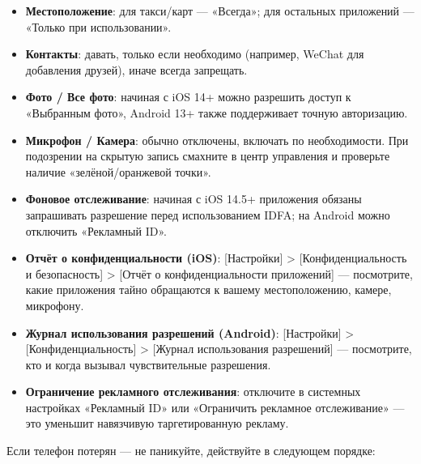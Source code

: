 
\begin{itemize}
  \item \textbf{Местоположение}: для такси/карт — «Всегда»; для остальных приложений — «Только при использовании».
  \item \textbf{Контакты}: давать, только если необходимо (например, WeChat для добавления друзей), иначе всегда запрещать.
  \item \textbf{Фото / Все фото}: начиная с iOS 14+ можно разрешить доступ к «Выбранным фото», Android 13+ также поддерживает точную авторизацию.
  \item \textbf{Микрофон / Камера}: обычно отключены, включать по необходимости. При подозрении на скрытую запись смахните в центр управления и проверьте наличие «зелёной/оранжевой точки».
  \item \textbf{Фоновое отслеживание}: начиная с iOS 14.5+ приложения обязаны запрашивать разрешение перед использованием IDFA; на Android можно отключить «Рекламный ID».
\end{itemize}


\begin{itemize}
  \item \textbf{Отчёт о конфиденциальности (iOS)}: [Настройки] > [Конфиденциальность и безопасность] > [Отчёт о конфиденциальности приложений] — посмотрите, какие приложения тайно обращаются к вашему местоположению, камере, микрофону.
  \item \textbf{Журнал использования разрешений (Android)}: [Настройки] > [Конфиденциальность] > [Журнал использования разрешений] — посмотрите, кто и когда вызывал чувствительные разрешения.
  \item \textbf{Ограничение рекламного отслеживания}: отключите в системных настройках «Рекламный ID» или «Ограничить рекламное отслеживание» — это уменьшит навязчивую таргетированную рекламу.
\end{itemize}


Если телефон потерян — не паникуйте, действуйте в следующем порядке:

